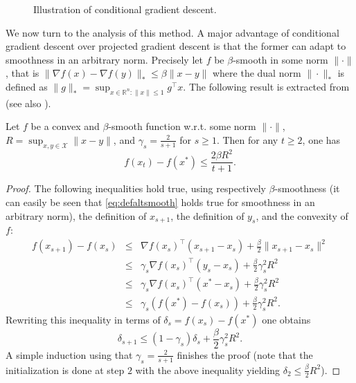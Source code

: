 \documentclass[openany]{now}
\newcommand{\cX}{\mathcal{X}}
\begin{document}
\begin{figure}
\begin{center}
\end{center}
\caption{Illustration of conditional gradient descent.}
\label{fig:FW}
\end{figure}

We now turn to the analysis of this method. A major advantage of conditional gradient descent over projected gradient descent is that the former can adapt to smoothness in an arbitrary norm. Precisely let $f$ be $\beta$-smooth in some norm $\|\cdot\|$, that is $\|\nabla f(x) - \nabla f(y) \|_* \leq \beta \|x-y\|$ where the dual norm $\|\cdot\|_*$ is defined as $\|g\|_* = \sup_{x \in \mathbb{R}^n : \|x\| \leq 1} g^{\top} x$. The following result is extracted from \cite{Jag13} (see also \cite{DH78}).


\begin{theorem}
Let $f$ be a convex and $\beta$-smooth function w.r.t. some norm $\|\cdot\|$, $R = \sup_{x, y \in \mathcal{X}} \|x - y\|$, and $\gamma_s = \frac{2}{s+1}$ for $s \geq 1$. Then for any $t \geq 2$, one has
$$f(x_t) - f(x^*) \leq \frac{2 \beta R^2}{t+1} .$$
\end{theorem}

\begin{proof}
The following inequalities hold true, using respectively $\beta$-smoothness (it can easily be seen that \eqref{eq:defaltsmooth} holds true for smoothness in an arbitrary norm), the definition of $x_{s+1}$, the definition of $y_s$, and the convexity of $f$:
\begin{eqnarray*}
f(x_{s+1}) - f(x_s) & \leq & \nabla f(x_s)^{\top} (x_{s+1} - x_s) + \frac{\beta}{2} \|x_{s+1} - x_s\|^2 \\
& \leq & \gamma_s \nabla f(x_s)^{\top} (y_{s} - x_s) + \frac{\beta}{2} \gamma_s^2 R^2 \\
& \leq & \gamma_s \nabla f(x_s)^{\top} (x^* - x_s) + \frac{\beta}{2} \gamma_s^2 R^2 \\
& \leq & \gamma_s (f(x^*) - f(x_s)) + \frac{\beta}{2} \gamma_s^2 R^2 .
\end{eqnarray*}
Rewriting this inequality in terms of $\delta_s = f(x_s) - f(x^*)$ one obtains
$$\delta_{s+1} \leq (1 - \gamma_s) \delta_s + \frac{\beta}{2} \gamma_s^2 R^2 .$$
A simple induction using that $\gamma_s = \frac{2}{s+1}$ finishes the proof (note that the initialization is done at step $2$ with the above inequality yielding $\delta_2 \leq \frac{\beta}{2} R^2$).
\end{proof}
\end{document}
